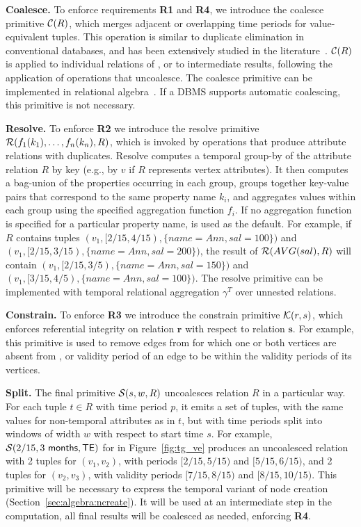{\bf Coalesce.} To enforce requirements {\bf R1} and {\bf R4}, we
introduce the coalesce primitive $\mathcal{C}(R)$, which merges adjacent or
overlapping time periods for value-equivalent tuples.  This operation
is similar to duplicate elimination in conventional databases, and has
been extensively studied in the
literature~\cite{DBLP:conf/vldb/BohlenSS96,DBLP:journals/sigmod/Zimanyi06}.
$\mathcal{C}(R)$ is applied to individual relations of \tve, or to
intermediate results, following the application of operations that
uncoalesce.
%
The coalesce primitive can be implemented in relational
algebra~\cite{DBLP:conf/vldb/BohlenSS96}.  If a DBMS supports
automatic coalescing, this primitive is not necessary.

{\bf Resolve.} To enforce {\bf R2} we introduce the resolve primitive
$\mathcal{R}(f_1(k_1), \ldots, f_n(k_n),R)$, which is invoked by
operations that produce attribute relations with duplicates.  Resolve
computes a temporal group-by of the attribute relation $R$ by key
(e.g., by $v$ if $R$ represents vertex attributes).  It then computes
a bag-union of the properties occurring in each group, groups together
key-value pairs that correspond to the same property name $k_i$, and
aggregates values within each group using the specified aggregation
function $f_i$.  If no aggregation function is specified for a
particular property name,  is used as the default.  For
example, if $R$ contains tuples $(v_1, [2/15,4/15),
  \{name=Ann,sal=100\})$ and $(v_1, [2/15, 3/15),
    \{name=Ann,sal=200\})$, the result of $\mathcal{R}(AVG(sal),R)$ will
    contain $(v_1, [2/15,3/5), \{name=Ann,sal=150\})$ and $(v_1,
      [3/15,4/5), \{name=Ann,sal=100\})$.  The resolve primitive can
        be implemented with temporal relational aggregation $\gamma^T$
        over unnested relations.

{\bf Constrain.} To enforce {\bf R3} we introduce the constrain
primitive $\mathcal{K}(r,s)$, which enforces referential integrity on
relation $\mathbf{r}$ with respect to relation $\mathbf{s}$.  For
example, this primitive is used to remove edges from \te for which one
or both vertices are absent from \tv, or validity period of an edge to
be within the validity periods of its vertices.  

{\bf Split.} The final primitive $\mathcal{S}(s,w,R)$ uncoalesces
relation $R$ in a particular way.  For each tuple $t \in R$ with time
period $p$, it emits a set of tuples, with the same values for
non-temporal attributes as in $t$, but with time periods split into
windows of width $w$ with respect to start time $s$.  For example,
$\mathcal{S}(2/15,3~\textsf{months},\textsf{TE})$ for  in
Figure~\ref{fig:tg_ve} produces an uncoalesced relation with 2 tuples
for $(v_1, v_2)$, with periods $[2/15, 5/15)$ and $[5/15, 6/15)$, and
    2 tuples for $(v_2, v_3)$, with validity periods $[7/15, 8/15)$
      and $[8/15, 10/15)$.  This primitive will be necessary to
        express the temporal variant of node creation
        (Section~\ref{sec:algebra:ncreate}).  It will be used
        at an intermediate step in the computation, all final results
        will be coalesced as needed, enforcing {\bf R4}.

